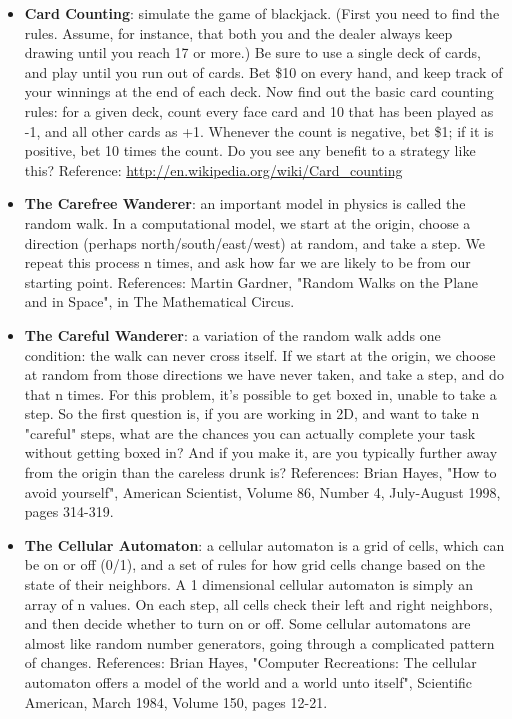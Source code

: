 \documentclass{article}
\begin{document}
\begin{itemize}
    \item  \textbf{Card Counting}: simulate the game of blackjack. (First you need to find the rules. Assume, for instance, that both you and the dealer always keep drawing until you reach 17 or more.) Be sure to use a single deck of cards, and play until you run out of cards. Bet \$10 on every hand, and keep track of your winnings at the end of each deck. Now find out the basic card counting rules: for a given deck, count every face card and 10 that has been played as -1, and all other cards as +1. Whenever the count is negative, bet \$1; if it is positive, bet 10 times the count. Do you see any benefit to a strategy like this? Reference: \url{http://en.wikipedia.org/wiki/Card_counting}

\item \textbf{The Carefree Wanderer}: an important model in physics is called the random walk. In a computational model, we start at the origin, choose a direction (perhaps north/south/east/west) at random, and take a step. We repeat this process n times, and ask how far we are likely to be from our starting point. References: Martin Gardner, "Random Walks on the Plane and in Space", in The Mathematical Circus.

\item \textbf{The Careful Wanderer}: a variation of the random walk adds one condition: the walk can never cross itself. If we start at the origin, we choose at random from those directions we have never taken, and take a step, and do that n times. For this problem, it's possible to get boxed in, unable to take a step. So the first question is, if you are working in 2D, and want to take n "careful" steps, what are the chances you can actually complete your task without getting boxed in? And if you make it, are you typically further away from the origin than the careless drunk is? References: Brian Hayes, "How to avoid yourself", American Scientist, Volume 86, Number 4, July-August 1998, pages 314-319.

\item \textbf{The Cellular Automaton}: a cellular automaton is a grid of cells, which can be on or off (0/1), and a set of rules for how grid cells change based on the state of their neighbors. A 1 dimensional cellular automaton is simply an array of n values. On each step, all cells check their left and right neighbors, and then decide whether to turn on or off. Some cellular automatons are almost like random number generators, going through a complicated pattern of changes. References: Brian Hayes, "Computer Recreations: The cellular automaton offers a model of the world and a world unto itself", Scientific American, March 1984, Volume 150, pages 12-21.


\end{itemize}
\end{document}
